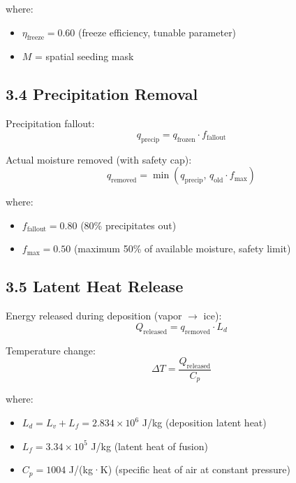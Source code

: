 \documentclass{article}
\begin{document}
where:
\begin{itemize}
    \item $\eta_{\text{freeze}} = 0.60$ (freeze efficiency, tunable parameter)
    \item $M$ = spatial seeding mask
\end{itemize}

\subsection*{3.4 Precipitation Removal}

Precipitation fallout:
\begin{equation}
q_{\text{precip}} = q_{\text{frozen}} \cdot f_{\text{fallout}}
\end{equation}

Actual moisture removed (with safety cap):
\begin{equation}
q_{\text{removed}} = \min(q_{\text{precip}}, \, q_{\text{old}} \cdot f_{\max})
\end{equation}

where:
\begin{itemize}
    \item $f_{\text{fallout}} = 0.80$ (80\% precipitates out)
    \item $f_{\max} = 0.50$ (maximum 50\% of available moisture, safety limit)
\end{itemize}

\subsection*{3.5 Latent Heat Release}

Energy released during deposition (vapor $\rightarrow$ ice):
\begin{equation}
Q_{\text{released}} = q_{\text{removed}} \cdot L_d
\end{equation}

Temperature change:
\begin{equation}
\Delta T = \frac{Q_{\text{released}}}{C_p}
\end{equation}

where:
\begin{itemize}
    \item $L_d = L_v + L_f = 2.834 \times 10^6$ J/kg (deposition latent heat)
    \item $L_f = 3.34 \times 10^5$ J/kg (latent heat of fusion)
    \item $C_p = 1004$ J/(kg·K) (specific heat of air at constant pressure)
\end{itemize}
\end{document}
